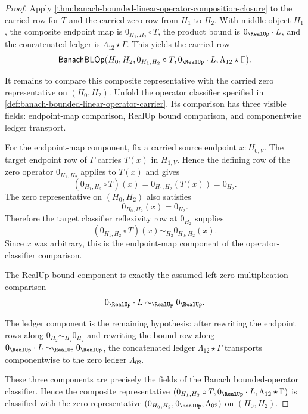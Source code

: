 \begin{proof}
Apply \autoref{thm:banach-bounded-linear-operator-composition-closure} to the carried row for $T$ and the carried zero row from $H_1$ to $H_2$. With middle object $H_1$, the composite endpoint map is $0_{H_1,H_2}\circ T$, the product bound is $0_{\RealUp}\cdot L$, and the concatenated ledger is $\Lambda_{12}\star\Gamma$. This yields the carried row
$$
\mathsf{BanachBLOp}(H_0,H_2,0_{H_1,H_2}\circ T,0_{\RealUp}\cdot L,\Lambda_{12}\star\Gamma).
$$

It remains to compare this composite representative with the carried zero representative on $(H_0,H_2)$. Unfold the operator classifier specified in \autoref{def:banach-bounded-linear-operator-carrier}. Its comparison has three visible fields: endpoint-map comparison, RealUp bound comparison, and componentwise ledger transport.

For the endpoint-map component, fix a carried source endpoint $x:H_{0,V}$. The target endpoint row of $\Gamma$ carries $T(x)$ in $H_{1,V}$. Hence the defining row of the zero operator $0_{H_1,H_2}$ applies to $T(x)$ and gives
$$
(0_{H_1,H_2}\circ T)(x)=0_{H_1,H_2}(T(x))=0_{H_2}.
$$
The zero representative on $(H_0,H_2)$ also satisfies
$$
0_{H_0,H_2}(x)=0_{H_2}.
$$
Therefore the target classifier reflexivity row at $0_{H_2}$ supplies
$$
(0_{H_1,H_2}\circ T)(x)\sim_{H_2}0_{H_0,H_2}(x).
$$
Since $x$ was arbitrary, this is the endpoint-map component of the operator-classifier comparison.

The RealUp bound component is exactly the assumed left-zero multiplication comparison
$$
0_{\RealUp}\cdot L\sim_{\RealUp}0_{\RealUp}.
$$

The ledger component is the remaining hypothesis: after rewriting the endpoint rows along $0_{H_2}\sim_{H_2}0_{H_2}$ and rewriting the bound row along $0_{\RealUp}\cdot L\sim_{\RealUp}0_{\RealUp}$, the concatenated ledger $\Lambda_{12}\star\Gamma$ transports componentwise to the zero ledger $\Lambda_{02}$.

These three components are precisely the fields of the Banach bounded-operator classifier. Hence the composite representative $(0_{H_1,H_2}\circ T,0_{\RealUp}\cdot L,\Lambda_{12}\star\Gamma)$ is classified with the zero representative $(0_{H_0,H_2},0_{\RealUp},\Lambda_{02})$ on $(H_0,H_2)$.
\end{proof}

